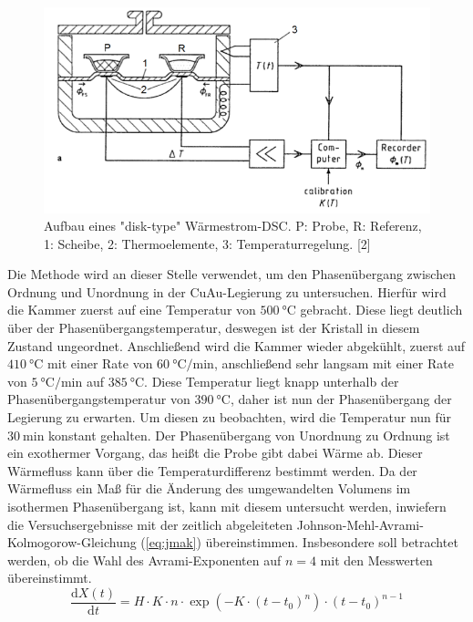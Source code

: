 \documentclass[
	a4paper,
	12pt,
	pagesize,
	ngerman
]{scrartcl}
\begin{document}
\begin{figure}[h]
	\centering
	\includegraphics[scale=0.7]{Kalorimeter.png}
	\caption{Aufbau eines "disk-type" Wärmestrom-DSC. P: Probe, R: Referenz, 1: Scheibe,
		2: Thermoelemente, 3: Temperaturregelung. [2]}
	\label{kalori}
\end{figure}

Die Methode wird an dieser Stelle verwendet, um den Phasenübergang zwischen Ordnung und Unordnung in der CuAu-Legierung zu untersuchen. Hierfür wird die Kammer zuerst auf eine Temperatur von $\SI{500}{\degreeCelsius}$ gebracht. Diese liegt deutlich über der Phasenübergangstemperatur, deswegen ist der Kristall in diesem Zustand ungeordnet. Anschließend wird die Kammer wieder abgekühlt, zuerst auf $\SI{410}{\degreeCelsius}$ mit einer Rate von $\SI{60}{\degreeCelsius/\minute}$, anschließend sehr langsam mit einer Rate von $\SI{5}{\degreeCelsius/\minute}$ auf $\SI{385}{\degreeCelsius}$. Diese Temperatur liegt knapp unterhalb der Phasenübergangstemperatur von $\SI{390}{\degreeCelsius}$, daher ist nun der Phasenübergang der Legierung zu erwarten. Um diesen zu beobachten, wird die Temperatur nun für $\SI{30}{\minute}$ konstant gehalten. Der Phasenübergang von Unordnung zu Ordnung ist ein exothermer Vorgang, das heißt die Probe gibt dabei Wärme ab. Dieser Wärmefluss kann über die Temperaturdifferenz bestimmt werden. Da der Wärmefluss ein Maß für die Änderung des umgewandelten Volumens im isothermen Phasenübergang ist, kann mit diesem untersucht werden, inwiefern die Versuchsergebnisse mit der zeitlich abgeleiteten Johnson-Mehl-Avrami-Kolmogorow-Gleichung (\cref{eq:jmak}) übereinstimmen. Insbesondere soll betrachtet werden, ob die Wahl des Avrami-Exponenten auf $n=4$ mit den Messwerten übereinstimmt.
\begin{equation}
	\frac{\mathrm{d}X(t)}{\mathrm{d}t} = H \cdot K \cdot n \cdot \exp(-K\cdot (t-t_0)^n)\cdot (t-t_0)^{n-1}
	\label{eq:jmak}
\end{equation}
\end{document}
